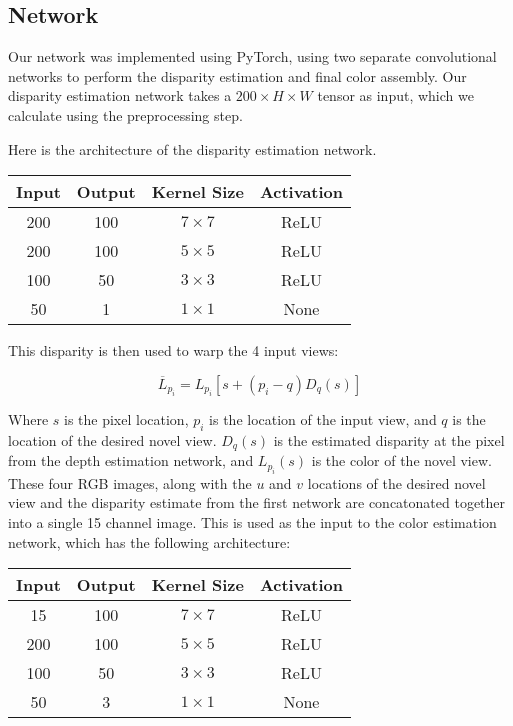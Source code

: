 \documentclass[10pt,twocolumn,letterpaper]{article}
\begin{document}
\subsection{Network}

Our network was implemented using PyTorch, using two separate convolutional networks to perform the
disparity estimation and final color assembly. Our disparity estimation network takes a 
$200 \times H \times W$ tensor as input, which we calculate using the preprocessing step.

Here is the architecture of the disparity estimation network.

\begin{center}
\begin{tabular}{|c c c c|}
    Input & Output & Kernel Size & Activation \\
    \hline
    200 & 100 & $7 \times 7$ & ReLU \\
    200 & 100 & $5 \times 5$ & ReLU \\
    100 & 50 & $3 \times 3$ & ReLU \\
    50 & 1 & $1 \times 1$ & None \\
\end{tabular}
\end{center}


This disparity is then used to warp the 4 input views:

$$
\overline{L}_{p_i} = L_{p_i} \left[ s + \left(p_i - q\right) D_q(s) \right]
$$

Where $s$ is the pixel location, $p_i$ is the location of the input view, and $q$ is the location of the
desired novel view. $D_q(s)$ is the estimated disparity at the pixel from the depth estimation network,
and $L_{p_i}(s)$ is the color of the novel view. These four RGB images, along with the $u$ and $v$ 
locations of the desired novel view and the disparity estimate from the first network are concatonated
together into a single 15 channel image. This is used as the input to the color estimation network, which
has the following architecture:

\begin{center}
\begin{tabular}{|c c c c|}
    Input & Output & Kernel Size & Activation \\
    \hline
    15 & 100 & $7 \times 7$ & ReLU \\
    200 & 100 & $5 \times 5$ & ReLU \\
    100 & 50 & $3 \times 3$ & ReLU \\
    50 & 3 & $1 \times 1$ & None \\
\end{tabular}
\end{center}
\end{document}
